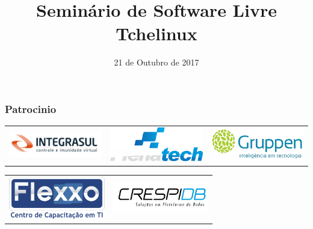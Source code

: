 

\def\alimentos{130}
\def\participantes{120}
\def\caridade{Banco de Alimentos\\ CAPS Joana D'Arc}
\def\palestrantes{Treze}
\def\palestras{Dezesseis}

\title{Seminário de Software Livre Tchelinux}
\author{}
\date{21 de Outubro de 2017}




\coverframe

\begin{frame}
    \frametitle{Patrocinio}
\begin{center}
\begin{tabular}[h]{ccc}
\includegraphics[width=4.2cm]{images/integrasul.png} &
\includegraphics[width=4.2cm]{images/plenatech.png} &
\includegraphics[width=4.2cm]{images/gruppen.png}
\end{tabular}
\vfill
\begin{tabular}[h]{cc}
\includegraphics[width=4.2cm]{images/flexxo.png} &
\includegraphics[width=4.2cm]{images/crespidb.png}
\end{tabular}
\end{center}
\end{frame}

